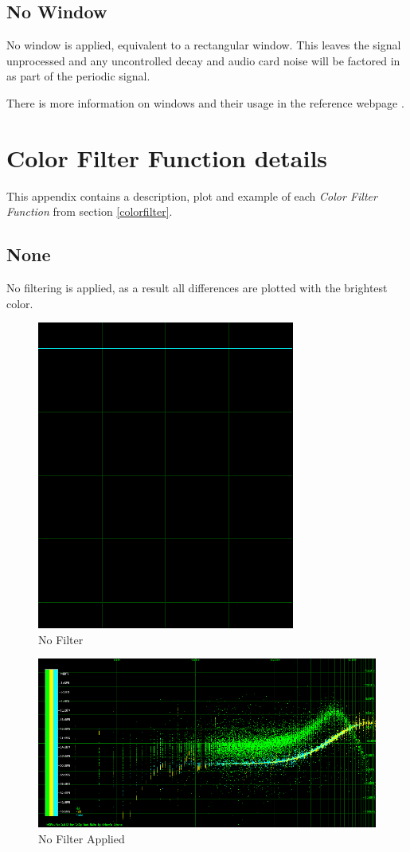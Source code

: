 \documentclass[10pt,a4paper]{report}
\begin{document}
\begin{appendices}
\section{No Window}

No window is applied, equivalent to a rectangular window. This leaves the signal unprocessed and any uncontrolled decay and audio card noise will be factored in as part of the periodic signal.

There is more information on windows and their usage in the reference webpage \cite{windowtypes}.

\chapter{Color Filter Function details}
\label{filterfunctions}

This appendix contains a description, plot and example of each \textit{Color Filter Function} from section \ref{colorfilter}.

\newpage
\section{None} 

No filtering is applied, as a result all differences are plotted with the brightest color. 

\begin{figure}[H]
	\centering
	\includegraphics[width=0.4\linewidth]{plots/BetaFunctionPlot_0.png}
	\caption[No Filter]{No Filter}
	\label{fig:betafunctionplot0}
\end{figure}

\begin{figure}[H]
	\centering
	\includegraphics[width=1\linewidth]{plots/BetaFunctionPlot_0_Data.png}
	\caption[No Filter]{No Filter Applied}
	\label{fig:betafunctionplot0data}
\end{figure}


\end{appendices}
\end{document}
